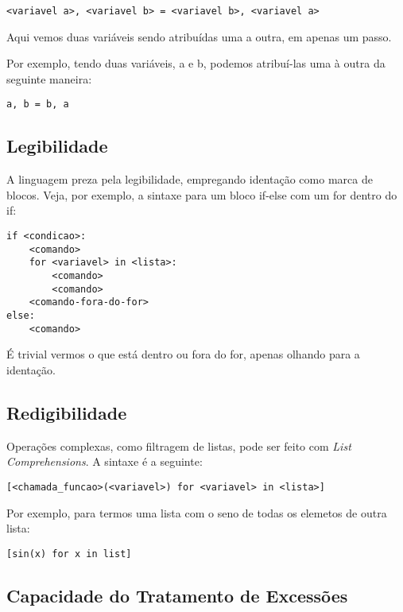 \documentclass[12pt]{article}
\begin{document}
\begin{lstlisting}
<variavel a>, <variavel b> = <variavel b>, <variavel a>
\end{lstlisting}

Aqui vemos duas variáveis sendo atribuídas uma a outra, em apenas um passo.

Por exemplo, tendo duas variáveis, \textsf{a} e \textsf{b}, podemos atribuí-las
uma à outra da seguinte maneira:

\begin{lstlisting}
a, b = b, a
\end{lstlisting}

\subsection{Legibilidade}\label{sec:legibilidade}

A linguagem preza pela legibilidade, empregando identação como marca de blocos.
Veja, por exemplo, a sintaxe para um bloco \textsf{if-else} com um \textsf{for}
dentro do \textsf{if}:

\begin{lstlisting}
if <condicao>:
    <comando>
    for <variavel> in <lista>:
        <comando>
        <comando>
    <comando-fora-do-for>
else:
    <comando>
\end{lstlisting}

É trivial vermos o que está dentro ou fora do \textsf{for}, apenas olhando para
a identação.

\subsection{Redigibilidade}\label{sec:redigibilidade}

Operações complexas, como filtragem de listas, pode ser feito com \textit{List
  Comprehensions}. A sintaxe é a seguinte:

\begin{lstlisting}
[<chamada_funcao>(<variavel>) for <variavel> in <lista>]
\end{lstlisting}

Por exemplo, para termos uma lista com o seno de todas os elemetos de outra
lista:

\begin{lstlisting}
[sin(x) for x in list]
\end{lstlisting}

\subsection{Capacidade do Tratamento de Excessões}\label{sec:excessoes}
\end{document}
